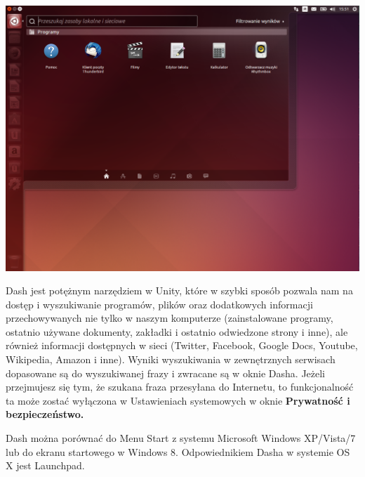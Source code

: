 \begin{center}
	\includegraphics[scale=0.5]{images/unity_pulpit_dash.png}
\end{center}

Dash jest potężnym narzędziem w Unity, które w szybki sposób pozwala nam na dostęp i wyszukiwanie programów, plików oraz dodatkowych informacji przechowywanych nie tylko w naszym komputerze (zainstalowane programy, ostatnio używane dokumenty, zakładki i ostatnio odwiedzone strony i inne), ale również informacji dostępnych w sieci (Twitter, Facebook, Google Docs, Youtube, Wikipedia, Amazon i inne). Wyniki wyszukiwania w zewnętrznych serwisach dopasowane są do wyszukiwanej frazy i zwracane są w oknie Dasha. Jeżeli przejmujesz się tym, że szukana fraza przesyłana do Internetu, to funkcjonalność ta może zostać wyłączona w Ustawieniach systemowych w oknie \textbf{Prywatność i bezpieczeństwo.}

Dash można porównać do Menu Start z systemu Microsoft Windows XP/Vista/7 lub do ekranu startowego w Windows 8. Odpowiednikiem Dasha w systemie OS X jest Launchpad.

